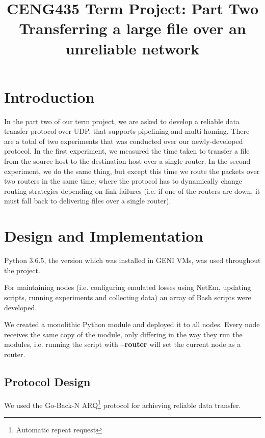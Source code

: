 \documentclass[conference]{IEEEtran}
\begin{document}
\title{%
  CENG435 Term Project: Part Two \\
  \large Transferring a large file over an unreliable network}

\author{
    \IEEEauthorblockA{}
\and
    \IEEEauthorblockA{}
}

\maketitle

\section{Introduction}
In the part two of our term project, we are asked to develop a reliable data transfer protocol
over UDP, that supports pipelining and multi-homing. There are a total of two experiments that
was conducted over our newly-developed protocol. In the first experiment, we measured the time
taken to transfer a file from the source host to the destination host over a single router. In
the second experiment, we do the same thing, but except this time we route the packets over two
routers in the same time; where the protocol has to dynamically change routing strategies
depending on link failures (i.e. if one of the routers are down, it must fall back to delivering
files over a single router).

\section{Design and Implementation}
Python 3.6.5, the version which was installed in GENI VMs, was used throughout the project.

For maintaining nodes (i.e. configuring emulated losses using NetEm, updating scripts, running
experiments and collecting data) an array of Bash scripts were developed.

We created a monolithic Python module and deployed it to all nodes. Every node receives the same
copy of the module, only differing in the way they run the modules, i.e. running the script with
\textbf{--router} will set the current node as a router.


\subsection{Protocol Design}
We used the Go-Back-N ARQ\footnote{Automatic repeat request} protocol for achieving reliable data transfer.
\end{document}
